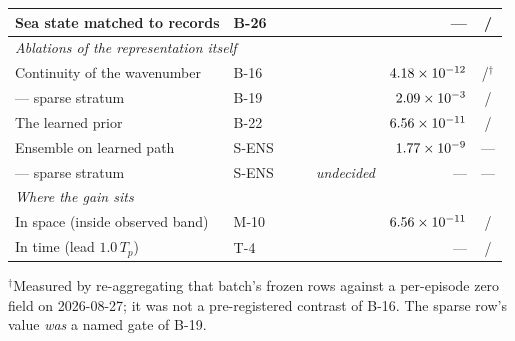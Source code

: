 \documentclass[review]{elsarticle}
\begin{document}
\begin{table}[!htbp]
\begin{tabular}{llccrrc}
Sea state matched to records & B-26 & \BTwentySixN{} & \BTwentySixBetter{} & \BTwentySixRel{} & --- & \BTwentySixCmpBetter{}/\BTwentySixN{} \\
\midrule
\multicolumn{7}{l}{\emph{Ablations of the representation itself}} \\
Continuity of the wavenumber & B-16 & \BSixteenN{} & \BSixteenBetter{} & \BSixteenRel{} & $4.18\times 10^{-12}{}$ & \BSixteenCmpZero{}/\BSixteenN{}$^\dagger$ \\
\quad --- sparse stratum & B-19 & \BNineteenN{} & \BNineteenBetter{} & \BNineteenRel{} & $2.09\times 10^{-3}{}$ & \BNineteenCmpZero{}/\BNineteenN{} \\
The learned prior & B-22 & \BTwentyTwoN{} & \BTwentyTwoBetter{} & \BTwentyTwoRel{} & $6.56\times 10^{-11}{}$ & \BTwentyTwoAnaShipZero{}/\BTwentyTwoN{} \\
Ensemble on learned path & S-ENS & \SEnsN{} & \SEnsBetter{} & \SEnsRel{} & $1.77\times 10^{-9}{}$ & --- \\
\quad --- sparse stratum & S-ENS & \SEnsSparseN{} & \SEnsSparseBetter{} & \emph{undecided} & --- & --- \\
\midrule
\multicolumn{7}{l}{\emph{Where the gain sits}} \\
In space (inside observed band) & M-10 & \MTenN{} & \MTenBetter{} & \MTenRel{} & $6.56\times 10^{-11}{}$ & \MTenCmp{}/\MTenN{} \\
In time (lead $1.0\,T_p$) & T-4 & \TFourN{} & \TFourBetter{} & \TFourRel{} & --- & \TFourCmp{}/\TFourN{} \\
\bottomrule
\end{tabular}

{\footnotesize $^\dagger$Measured by re-aggregating that batch's frozen rows against a
per-episode zero field on 2026-08-27; it was not a pre-registered contrast of B-16. The
sparse row's value \emph{was} a named gate of B-19.\par}

\end{table}

\end{document}
